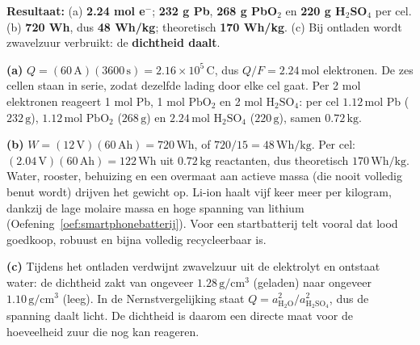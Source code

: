 \begin{oplossing}
\textbf{Resultaat:} (a) \textbf{2.24 mol e\ensuremath{^{-}}}; \textbf{232 g Pb}, \textbf{268 g PbO\ensuremath{_{2}}} en \textbf{220 g H\ensuremath{_{2}}SO\ensuremath{_{4}}} per cel. (b) \textbf{720 Wh}, dus \textbf{48 Wh/kg}; theoretisch \textbf{170 Wh/kg}. (c) Bij ontladen wordt zwavelzuur verbruikt: de \textbf{dichtheid daalt}.

\textbf{(a)} \(Q = (60\,\mathrm{A})(3600\,\mathrm{s}) = 2.16\times10^{5}\,\mathrm{C}\), dus \(Q/F = 2.24\,\mathrm{mol}\) elektronen. De zes cellen staan in serie, zodat dezelfde lading door elke cel gaat. Per 2 mol elektronen reageert 1 mol Pb, 1 mol \(\mathrm{PbO_2}\) en 2 mol \(\mathrm{H_2SO_4}\): per cel \(1.12\,\mathrm{mol}\) Pb (\(232\,\mathrm{g}\)), \(1.12\,\mathrm{mol}\) \(\mathrm{PbO_2}\) (\(268\,\mathrm{g}\)) en \(2.24\,\mathrm{mol}\) \(\mathrm{H_2SO_4}\) (\(220\,\mathrm{g}\)), samen \(0.72\,\mathrm{kg}\).

\textbf{(b)} \(W = (12\,\mathrm{V})(60\,\mathrm{Ah}) = 720\,\mathrm{Wh}\), of \(720/15 = 48\,\mathrm{Wh/kg}\). Per cel: \((2.04\,\mathrm{V})(60\,\mathrm{Ah}) = 122\,\mathrm{Wh}\) uit \(0.72\,\mathrm{kg}\) reactanten, dus theoretisch \(170\,\mathrm{Wh/kg}\). Water, rooster, behuizing en een overmaat aan actieve massa (die nooit volledig benut wordt) drijven het gewicht op. Li-ion haalt vijf keer meer per kilogram, dankzij de lage molaire massa en hoge spanning van lithium (Oefening~\ref{oef:smartphonebatterij}). Voor een startbatterij telt vooral dat lood goedkoop, robuust en bijna volledig recycleerbaar is.

\textbf{(c)} Tijdens het ontladen verdwijnt zwavelzuur uit de elektrolyt en ontstaat water: de dichtheid zakt van ongeveer \(1.28\,\mathrm{g/cm^3}\) (geladen) naar ongeveer \(1.10\,\mathrm{g/cm^3}\) (leeg). In de Nernstvergelijking staat \(Q = a_{\mathrm{H_2O}}^2/a_{\mathrm{H_2SO_4}}^2\), dus de spanning daalt licht. De dichtheid is daarom een directe maat voor de hoeveelheid zuur die nog kan reageren.
\end{oplossing}

